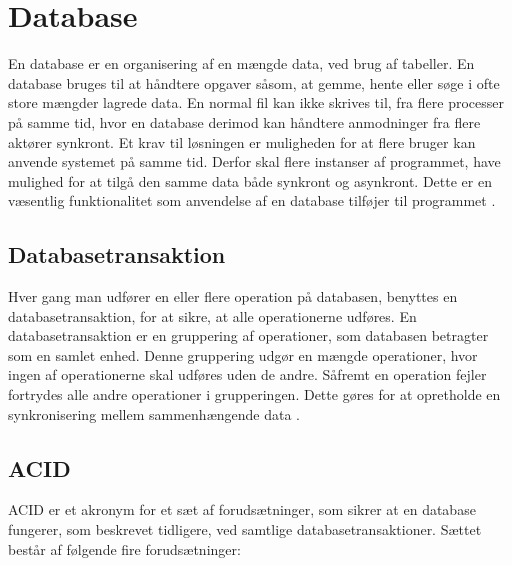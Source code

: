 \section{Database} 
\label{sec:database}

En database er en organisering af en mængde data, ved brug af tabeller. En database bruges til at håndtere opgaver såsom, at gemme, hente eller søge i ofte store mængder lagrede data. En normal fil kan ikke skrives til, fra flere processer på samme tid, hvor en database derimod kan håndtere anmodninger fra flere aktører synkront. Et krav til løsningen er muligheden for at flere bruger kan anvende systemet på samme tid. Derfor skal flere instanser af programmet, have mulighed for at tilgå den samme data både synkront og asynkront. Dette er en væsentlig funktionalitet som anvendelse af en database tilføjer til programmet \cite{DatabaseMicosoftOffice}. 

\subsection{Databasetransaktion}
\label{sub:databasetransaktion}

Hver gang man udfører en eller flere operation på databasen, benyttes en databasetransaktion, for at sikre, at alle operationerne udføres. En databasetransaktion er en gruppering af operationer, som databasen betragter som en samlet enhed. Denne gruppering udgør en mængde operationer, hvor ingen af operationerne skal udføres uden de andre. Såfremt en operation fejler fortrydes alle andre operationer i grupperingen. Dette gøres for at opretholde en synkronisering mellem sammenhængende data \cite{databasetransaktion}.

\subsection{ACID}
\label{sub:acid}

ACID er et akronym for et sæt af forudsætninger, som sikrer at en database fungerer, som beskrevet tidligere, ved samtlige databasetransaktioner. Sættet består af følgende fire forudsætninger: 

